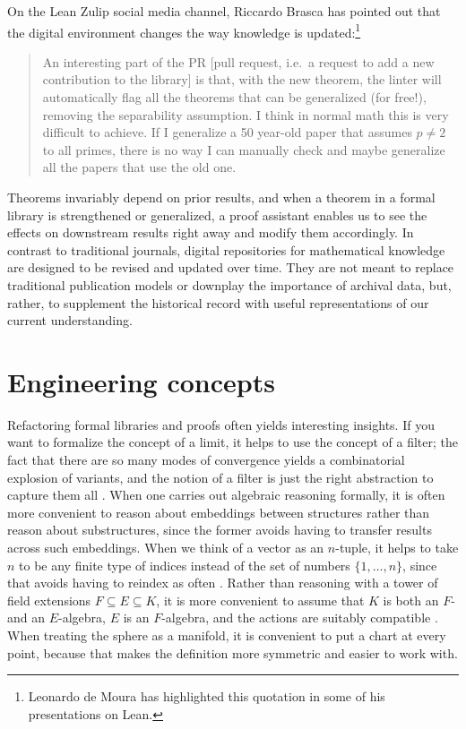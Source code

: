 \documentclass[12pt]{amsart}
\theoremstyle{definition}
\theoremstyle{remark}
\numberwithin{equation}{section}
\begin{document}
On the Lean Zulip social media channel, Riccardo Brasca has pointed out that the digital environment changes the way knowledge is updated:\footnote{Leonardo de Moura has highlighted this quotation in some of his presentations on Lean.}
\begin{quote}
  An interesting part of the PR [pull request, i.e.~a request to add a new contribution to the library] is that, with the new theorem, the linter will automatically flag all the theorems that can be generalized (for free!), removing the separability assumption. I think in normal math this is very difficult to achieve. If I generalize a 50 year-old paper that assumes $p \ne 2$ to all primes, there is no way I can manually check and maybe generalize all the papers that use the old one.
\end{quote}
Theorems invariably depend on prior results, and when a theorem in a formal library is strengthened or generalized, a proof assistant enables us to see the effects on downstream results right away and modify them accordingly. In contrast to traditional journals, digital repositories for mathematical knowledge are designed to be revised and updated over time. They are not meant to replace traditional publication models or downplay the importance of archival data, but, rather, to supplement the historical record with useful representations of our current understanding.


\section{Engineering concepts}

Refactoring formal libraries and proofs often yields interesting insights. If you want to formalize the concept of a limit, it helps to use the concept of a filter; the fact that there are so many modes of convergence yields a combinatorial explosion of variants, and the notion of a filter is just the right abstraction to capture them all \cite{holzl:et:al:13}. When one carries out algebraic reasoning formally, it is often more convenient to reason about embeddings between structures rather than reason about substructures, since the former avoids having to transfer results across such embeddings. When we think of a vector as an $n$-tuple, it helps to take $n$ to be any finite type of indices instead of the set of numbers $\{1, \ldots, n\}$, since that avoids having to reindex as often \cite{mathlib:20}. Rather than reasoning with a tower of field extensions $F \subseteq E \subseteq K$, it is more convenient to assume that $K$ is both an $F$- and an $E$-algebra, $E$ is an $F$-algebra, and the actions are suitably compatible \cite{baanen:et:al:22}. When treating the sphere as a manifold, it is convenient to put a chart at every point, because that makes the definition more symmetric and easier to work with.
\end{document}
